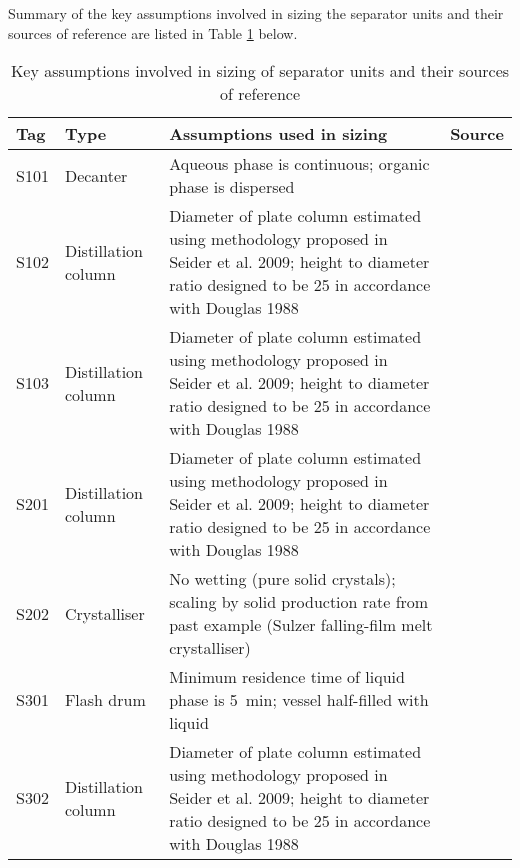 \noindent Summary of the key assumptions involved in sizing the separator units and their sources of reference are listed in Table \ref{tab:assumptions of sizing separator units} below. 

\begin{table}[h]
\centering\small
    \caption{Key assumptions involved in sizing of separator units and their sources of reference}
    \label{tab:assumptions of sizing separator units}\footnotesize
\begin{tabularx}{\linewidth}{llXl}
\toprule
Tag  & Type                 & Assumptions used in sizing                                                                                                                                      & Source                                             \\ \midrule
S101 & Decanter             & Aqueous phase is continuous; organic phase is dispersed                                                                                                         & \cite{ludwig_applied_1994}                         \\
S102 & Distillation column  & Diameter of plate column estimated using methodology proposed in Seider et al. 2009; height to diameter ratio designed to be 25 in accordance with Douglas 1988 & \cite{seider_product_2009,douglas_conceptual_1988} \\
S103 & Distillation column  & Diameter of plate column estimated using methodology proposed in Seider et al. 2009; height to diameter ratio designed to be 25 in accordance with Douglas 1988 & \cite{seider_product_2009,douglas_conceptual_1988} \\
S201 & Distillation column  & Diameter of plate column estimated using methodology proposed in Seider et al. 2009; height to diameter ratio designed to be 25 in accordance with Douglas 1988 & \cite{seider_product_2009,douglas_conceptual_1988} \\
S202 & Crystalliser         & No wetting (pure solid crystals); scaling by solid production rate from past example (Sulzer falling-film melt crystalliser)                                    & \cite{seader_separation_2011}                      \\
S301 & Flash drum           & Minimum residence time of liquid phase is \SI{5}{\minute}; vessel half-filled with liquid                                                                                 & \cite{seader_separation_2011}                      \\
S302 & Distillation column  & Diameter of plate column estimated using methodology proposed in Seider et al. 2009; height to diameter ratio designed to be 25 in accordance with Douglas 1988 & \cite{seider_product_2009,douglas_conceptual_1988} \\

\end{tabularx}
\end{table}
